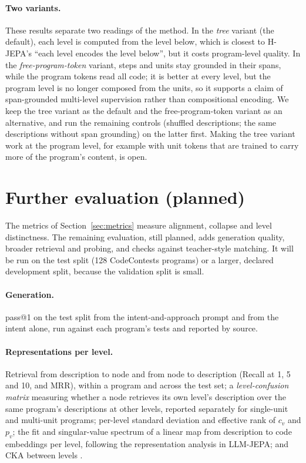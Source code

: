 \documentclass[11pt]{article}
\begin{document}
\paragraph{Two variants.} These results separate two readings of the method. In the \emph{tree} variant (the
default), each level is computed from the level below, which is closest to H-JEPA's ``each level encodes the level
below'', but it costs program-level quality. In the \emph{free-program-token} variant, steps and units stay grounded
in their spans, while the program tokens read all code; it is better at every level, but the program level is no
longer composed from the units, so it supports a claim of span-grounded multi-level supervision rather than
compositional encoding. We keep the tree variant as the default and the free-program-token variant as an
alternative, and run the remaining controls (shuffled descriptions; the same descriptions without span grounding) on
the latter first. Making the tree variant work at the program level, for example with unit tokens that are trained
to carry more of the program's content, is open.

\section{Further evaluation (planned)}
\label{sec:evaluation}

The metrics of Section~\ref{sec:metrics} measure alignment, collapse and level distinctness. The remaining
evaluation, still planned, adds generation quality, broader retrieval and probing, and checks against teacher-style
matching. It will be run on the test split (128 CodeContests programs) or a larger, declared development split,
because the validation split is small.

\paragraph{Generation.} pass@1 on the test split from the intent-and-approach prompt and from the intent alone, run
against each program's tests and reported by source.

\paragraph{Representations per level.}
Retrieval from description to node and from node to description (Recall at 1, 5 and 10, and MRR), within a program and across the test
set; a \emph{level-confusion matrix} measuring whether a node retrieves its own level's description over the same
program's descriptions at other levels, reported separately for single-unit and multi-unit programs; per-level
standard deviation and effective rank of $c_v$ and $p_v$; the fit and singular-value spectrum of a linear map from
description to code embeddings per level, following the representation analysis in LLM-JEPA; and CKA between levels
\citep{kornblith2019cka}.
\end{document}
